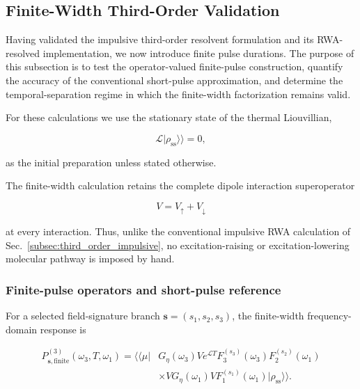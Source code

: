 \documentclass[11pt]{article}
\begin{document}
\subsection{Finite-Width Third-Order Validation}
\label{subsec:third_order_finite_width}

Having validated the impulsive third-order resolvent formulation and its
RWA-resolved implementation, we now introduce finite pulse durations.
The purpose of this subsection is to test the operator-valued
finite-pulse construction, quantify the accuracy of the conventional
short-pulse approximation, and determine the temporal-separation regime
in which the finite-width factorization remains valid.

For these calculations we use the stationary state of the thermal
Liouvillian,

\begin{equation}
\mathcal{L}
|\rho_{\mathrm{ss}}\rangle\rangle
=
0,
\end{equation}

as the initial preparation unless stated otherwise.

The finite-width calculation retains the complete dipole interaction
superoperator

\begin{equation}
V
=
V_{\uparrow}
+
V_{\downarrow}
\end{equation}

at every interaction.  Thus, unlike the conventional impulsive RWA
calculation of Sec.~\ref{subsec:third_order_impulsive}, no
excitation-raising or excitation-lowering molecular pathway is imposed
by hand.


\subsubsection{Finite-pulse operators and short-pulse reference}

For a selected field-signature branch
$\mathbf{s}=(s_1,s_2,s_3)$, the finite-width frequency-domain response is

\begin{equation}
\boxed{
\begin{aligned}
P_{\mathbf{s},\mathrm{finite}}^{(3)}
(\omega_3,T,\omega_1)
=
\langle\!\langle\mu|
&G_\eta(\omega_3)
V
e^{\mathcal{L}T}
F_3^{(s_3)}(\omega_3)
F_2^{(s_2)}(\omega_1)
\\
&\times
V
G_\eta(\omega_1)
V
F_1^{(s_1)}(\omega_1)
|\rho_{\mathrm{ss}}\rangle\rangle .
\end{aligned}
}
\label{eq:third_order_finite_validation}
\end{equation}
\end{document}
